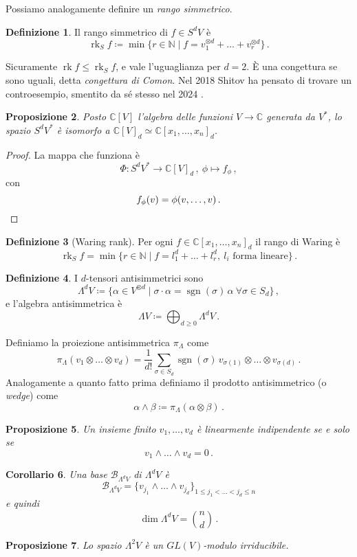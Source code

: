 \documentclass[a4paper, 11pt]{article}
\theoremstyle{definition}
\newtheorem{Def}{Definizione}[section]
\theoremstyle{plain}
\newtheorem{Prop}[Def]{Proposizione}
\newtheorem{Cor}[Def]{Corollario}
\newcommand{\C}{\mathbb{C}}
\newcommand{\N}{\mathbb{N}}
\newcommand{\deff}{\coloneqq}
\DeclareMathOperator{\sgn}{sgn}
\DeclareMathOperator{\rk}{rk}
\begin{document}
Possiamo analogamente definire un \emph{rango simmetrico}.
\begin{Def}
	Il rango simmetrico di $f \in S^dV$ è
	\[
		\rk_S f \deff \min\{r \in \N \mid f = v_1^{\otimes d} + \dots + v_r^{\otimes d}\}\,.
	\]
\end{Def}
Sicuramente $\rk f \le \rk_S f$, e vale l'uguaglianza per $d = 2$. È una congettura se sono uguali, detta \emph{congettura di Comon}. Nel 2018 Shitov \cite{Shitov2018} ha pensato di trovare un controesempio, smentito da sé stesso nel 2024 \cite{Draisma2024}.

\begin{Prop}
	
	Posto $\C[V]$ l'algebra delle funzioni $V \to \C$ generata da $V^*$, lo spazio $S^dV^*$ è isomorfo a $\C[V]_d \simeq \C[x_1, \dots, x_n]_d$.
\end{Prop}
\begin{proof}
	La mappa che funziona è 
	\[
		\Phi \colon S^dV^* \to \C[V]_d\,, \ \phi \mapsto f_\phi\,,
	\]
	con
	\[
			f_\phi(v) = \phi(v,\dots, v)\,. \qedhere
	\]
\end{proof}
\begin{Def}[Waring rank]
	Per ogni $f \in \C[x_1, \dots, x_n]_d$ il rango di Waring è 
	\[
		\rk_S f = \min\{r \in \N \mid f = l_1^d + \dots + l_r^d, \ l_i \text{ forma lineare}\}\,.
	\]
\end{Def}

\begin{Def}
	I $d$-tensori antisimmetrici sono 
	\[
	\Lambda^d V \deff \{\alpha \in V^{\otimes d} \mid \sigma \cdot \alpha =\sgn(\sigma)\, \alpha\ \forall \sigma \in S_d \}\,,
	\]
	e l'algebra antisimmetrica è
	\[
	\Lambda V \deff \bigoplus_{d \ge 0} \Lambda^{d}V\,.
	\]
\end{Def}

Definiamo la proiezione antisimmetrica $\pi_\Lambda$ come
\[
	\pi_\Lambda(v_1 \otimes\dots\otimes v_d) = \frac{1}{d!}\sum_{\sigma \in S_d}\sgn(\sigma)\,v_{\sigma(1)}\otimes\dots\otimes v_{\sigma(d)}\,.
\]
Analogamente a quanto fatto prima definiamo il prodotto antisimmetrico (o \emph{wedge}) come
\[
	\alpha \wedge \beta \deff \pi_\Lambda(\alpha\otimes\beta)\,.
\]
\begin{Prop}
	Un insieme finito $v_1, \dots, v_d$ è linearmente indipendente se e solo se 
	\[
		v_1\wedge \dots \wedge v_d = 0\,.
	\]
\end{Prop}
\begin{Cor}
	Una base $\mathcal{B}_{\Lambda^dV}$ di $\Lambda^dV$ è 
	\[
		\mathcal{B}_{\Lambda^dV} = \{v_{j_1}\wedge\dots\wedge v_{j_d}\}_{1\le j_1 < \dots< j_d\le n}
	\]
	e quindi
	\[
		\dim \Lambda^dV = \binom{n}{d}\,.
	\]
\end{Cor}
\begin{Prop}
	Lo spazio $\Lambda^2V$ è un $GL(V)$-modulo irriducibile.
\end{Prop}
\end{document}
